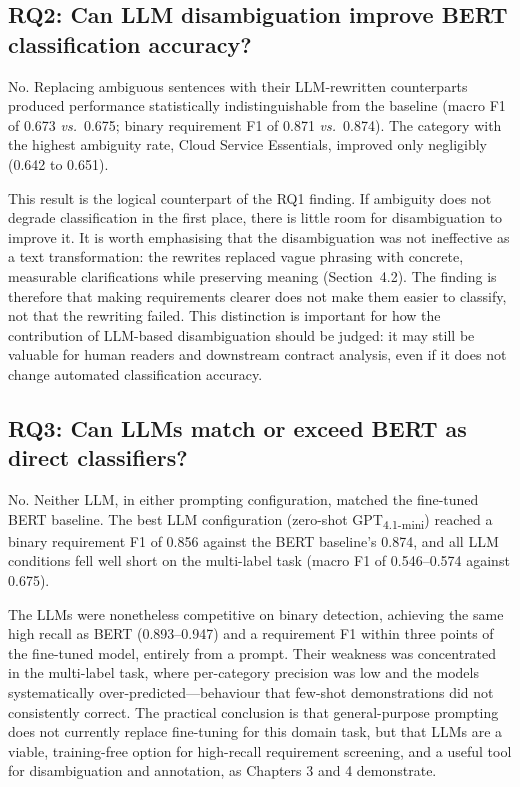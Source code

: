 \subsection{RQ2: Can LLM disambiguation improve BERT classification accuracy?}

No. Replacing ambiguous sentences with their LLM-rewritten counterparts produced performance statistically indistinguishable from the baseline (macro F1 of 0.673 \textit{vs.}~0.675; binary requirement F1 of 0.871 \textit{vs.}~0.874). The category with the highest ambiguity rate, Cloud Service Essentials, improved only negligibly (0.642 to 0.651).

This result is the logical counterpart of the RQ1 finding. If ambiguity does not degrade classification in the first place, there is little room for disambiguation to improve it. It is worth emphasising that the disambiguation was not ineffective as a text transformation: the rewrites replaced vague phrasing with concrete, measurable clarifications while preserving meaning (Section~4.2). The finding is therefore that making requirements clearer does not make them easier to classify, not that the rewriting failed. This distinction is important for how the contribution of LLM-based disambiguation should be judged: it may still be valuable for human readers and downstream contract analysis, even if it does not change automated classification accuracy.

\subsection{RQ3: Can LLMs match or exceed BERT as direct classifiers?}

No. Neither LLM, in either prompting configuration, matched the fine-tuned BERT baseline. The best LLM configuration (zero-shot GPT\textsubscript{4.1-mini}) reached a binary requirement F1 of 0.856 against the BERT baseline's 0.874, and all LLM conditions fell well short on the multi-label task (macro F1 of 0.546--0.574 against 0.675).

The LLMs were nonetheless competitive on binary detection, achieving the same high recall as BERT (0.893--0.947) and a requirement F1 within three points of the fine-tuned model, entirely from a prompt. Their weakness was concentrated in the multi-label task, where per-category precision was low and the models systematically over-predicted---behaviour that few-shot demonstrations did not consistently correct. The practical conclusion is that general-purpose prompting does not currently replace fine-tuning for this domain task, but that LLMs are a viable, training-free option for high-recall requirement screening, and a useful tool for disambiguation and annotation, as Chapters 3 and 4 demonstrate.

